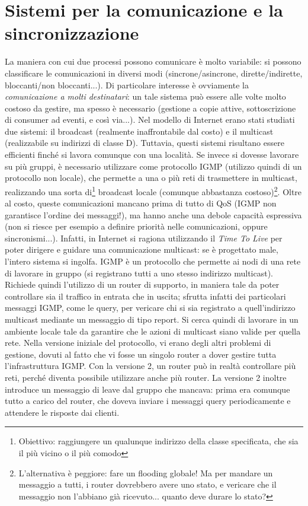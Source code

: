 \section{Sistemi per la comunicazione e la sincronizzazione}
La maniera con cui due processi possono comunicare è molto variabile: si possono classificare le comunicazioni in
diversi modi (sincrone/asincrone, dirette/indirette, bloccanti/non bloccanti...). Di particolare interesse è
ovviamente la \textit{comunicazione a molti destinatari}: un tale sistema può essere alle volte molto costoso da
gestire, ma spesso è necessario (gestione a copie attive, sottoscrizione di consumer ad eventi, e così via...).
Nel modello di Internet erano stati studiati due sistemi: il broadcast (realmente inaffrontabile dal costo) e
il multicast (realizzabile su indirizzi di classe D). Tuttavia, questi sistemi risultano essere efficienti finché si
lavora comunque con una località. Se invece si dovesse lavorare su più gruppi, è necessario utilizzare come protocollo
IGMP (utilizzo quindi di un protocollo non locale), che permette a una o più reti di trasmettere in multicast,
realizzando una sorta di\footnote{Obiettivo: raggiungere un qualunque indirizzo della classe specificata, che sia il più
vicino o il più comodo} broadcast locale (comunque abbastanza costoso)\footnote{L'alternativa è peggiore: fare un
flooding globale! Ma per mandare un messaggio a tutti, i router dovrebbero avere uno stato, e vericare che il messaggio
non l'abbiano già ricevuto... quanto deve durare lo stato?}. Oltre al costo, queste comunicazioni mancano prima di 
tutto di QoS (IGMP non garantisce l'ordine dei messaggi!), ma hanno anche una debole capacità espressiva (non si riesce
per esempio a definire priorità nelle comunicazioni, oppure sincronismi...). Infatti, in Internet si ragiona utilizzando
il \textit{Time To Live} per poter dirigere e guidare una comunicazione multicast: se è progettato male, l'intero
sistema si ingolfa. 
IGMP è un protocollo che permette ai nodi di una rete di lavorare in gruppo (si registrano tutti a uno stesso indirizzo
multicast). Richiede quindi l'utilizzo di un router di supporto, in maniera tale da poter controllare sia il traffico in
entrata che in uscita; sfrutta infatti dei particolari messaggi IGMP, come le query, per vericare chi si sia registrato
a quell'indirizzo multicast mediante un messaggio di tipo report. Si cerca quindi di lavorare in un ambiente locale tale
da garantire che le azioni di multicast siano valide per quella rete.
Nella versione iniziale del protocollo, vi erano degli altri problemi di gestione, dovuti al fatto che vi fosse un
singolo router a dover gestire tutta l'infrastruttura IGMP. Con la versione 2, un router può in realtà controllare più
reti, perché diventa possibile utilizzare anche più router. La versione 2 inoltre introduce un messaggio di leave dal
gruppo che mancava: prima era comunque tutto a carico del router, che doveva inviare i messaggi query periodicamente
e attendere le risposte dai clienti.
